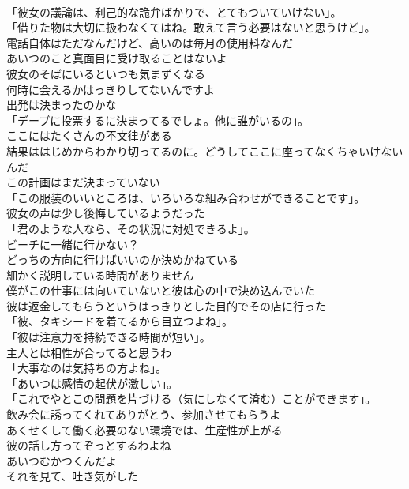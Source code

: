 \documentclass[8pt]{extreport}
\begin{document}
\begin{CJK}{UTF8}{min}
\\	「彼女の議論は、利己的な詭弁ばかりで、とてもついていけない」。	
\\	「借りた物は大切に扱わなくてはね。敢えて言う必要はないと思うけど」。	
\\	電話自体はただなんだけど、高いのは毎月の使用料なんだ	
\\	あいつのこと真面目に受け取ることはないよ	
\\	彼女のそばにいるといつも気まずくなる	
\\	何時に会えるかはっきりしてないんですよ	
\\	出発は決まったのかな	
\\	「デーブに投票するに決まってるでしょ。他に誰がいるの」。	
\\	ここにはたくさんの不文律がある	
\\	結果ははじめからわかり切ってるのに。どうしてここに座ってなくちゃいけないんだ	
\\	この計画はまだ決まっていない	
\\	「この服装のいいところは、いろいろな組み合わせができることです」。	
\\	彼女の声は少し後悔しているようだった	
\\	「君のような人なら、その状況に対処できるよ」。	
\\	ビーチに一緒に行かない？	
\\	どっちの方向に行けばいいのか決めかねている	
\\	細かく説明している時間がありません	
\\	僕がこの仕事には向いていないと彼は心の中で決め込んでいた	
\\	彼は返金してもらうというはっきりとした目的でその店に行った	
\\	「彼、タキシードを着てるから目立つよね」。	
\\	「彼は注意力を持続できる時間が短い」。	
\\	主人とは相性が合ってると思うわ	
\\	「大事なのは気持ちの方よね」。	
\\	「あいつは感情の起伏が激しい」。	
\\	「これでやとこの問題を片づける（気にしなくて済む）ことができます」。	
\\	飲み会に誘ってくれてありがとう、参加させてもらうよ	
\\	あくせくして働く必要のない環境では、生産性が上がる	
\\	彼の話し方ってぞっとするわよね	
\\	あいつむかつくんだよ	
\\	それを見て、吐き気がした	

\end{CJK}
\end{document}
